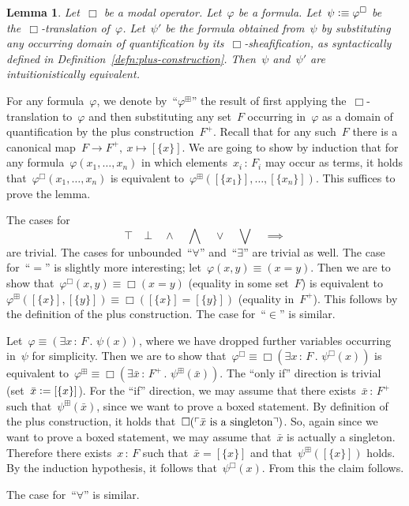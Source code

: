 \documentclass[10pt,reqno,a4paper]{amsbook}
\makeatletter
\theoremstyle{definition}
\theoremstyle{plain}
\newtheorem{lemma}[defn]{Lemma}
\theoremstyle{remark}
\newcommand{\?}{\,{:}\,}
\renewcommand{\_}{\mathpunct{.}\,}
\newcommand{\speak}[1]{\ulcorner\text{\textnormal{#1}}\urcorner}
\newcommand{\defeq}{\vcentcolon=}
\newcommand{\defequiv}{\vcentcolon\equiv}
\renewenvironment{proof}[1][\proofname]{\par
  \pushQED{\qed}%
  \normalfont \topsep6\p@\@plus6\p@\relax
  \trivlist
  \item[\hskip\labelsep
        \itshape
    #1\@addpunct{.}]\ignorespaces
}{%
  \popQED\endtrivlist\@endpefalse
}
\makeatother
\begin{document}
\begin{lemma}Let~$\Box$ be a modal operator. Let~$\varphi$ be a formula.
Let~$\psi \defequiv \varphi^\Box$ be the~$\Box$-translation of~$\varphi$.
Let~$\psi'$ be the formula obtained from~$\psi$ by substituting any occurring
domain of quantification by its~$\Box$-sheafification, as syntactically defined
in Definition~\ref{defn:plus-construction}. Then~$\psi$
and~$\psi'$ are intuitionistically equivalent.
\end{lemma}
\begin{proof}
For any formula~$\varphi$, we denote by~``$\varphi^\boxplus$'' the result of
first applying the~$\Box$-translation to~$\varphi$ and then substituting any
set~$F$ occurring in~$\varphi$ as a domain of quantification by the plus
construction~$F^+$. Recall that for any such~$F$ there is a canonical map~$F
\to F^+,\ x \mapsto [\{x\}]$. We are going to show by induction that for any
formula~$\varphi(x_1,\ldots,x_n)$ in which elements~$x_i\?F_i$ may occur as
terms, it holds that~$\varphi^\Box(x_1,\ldots,x_n)$ is equivalent
to~$\varphi^\boxplus([\{x_1\}],\ldots,[\{x_n\}])$. This suffices to prove the
lemma.

The cases for
\[ \top \quad \bot \quad \wedge \quad \bigwedge \quad \vee \quad \bigvee \quad \implies \]
are trivial. The cases for unbounded~``$\forall$'' and~``$\exists$'' are
trivial as well. The case for~``$=$'' is slightly more interesting; let~$\varphi(x,y)
\equiv (x = y)$. Then we are to show that~$\varphi^\Box(x,y) \equiv \Box(x=y)$
(equality in some set~$F$) is equivalent to~$\varphi^\boxplus([\{x\}],[\{y\}])
\equiv \Box([\{x\}] = [\{y\}])$ (equality in~$F^+$). This follows by the
definition of the plus construction. The case for~``$\in$'' is similar.

Let~$\varphi \equiv (\exists x\?F\_ \psi(x))$, where we have dropped further
variables occurring in~$\psi$ for simplicity. Then we are to show
that~$\varphi^\Box \equiv \Box(\exists x\?F\_ \psi^\Box(x))$ is equivalent
to~$\varphi^\boxplus \equiv \Box(\exists \bar x\?F^+\_ \psi^\boxplus(\bar x))$.
The ``only if'' direction is trivial (set~$\bar x \defeq [\{x\}]$). For the ``if''
direction, we may assume that there exists~$\bar x\?F^+$ such
that~$\psi^\boxplus(\bar x)$, since we want to prove a boxed statement. By
definition of the plus construction, it holds that~$\Box(\speak{$\bar x$ is a
singleton})$. So, again since we want to prove a boxed statement, we may assume
that~$\bar x$ is actually a singleton. Therefore there exists~$x\?F$ such
that~$\bar x = [\{x\}]$ and that~$\psi^\boxplus([\{x\}])$ holds. By the induction
hypothesis, it follows that~$\psi^\Box(x)$. From this the claim follows.

The case for~``$\forall$'' is similar.
\end{proof}
\end{document}
